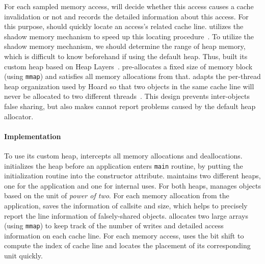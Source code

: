For each sampled memory access, \cheetah{} will decide whether this access causes a cache invalidation or not and records the detailed information about this access. For this purpose, \cheetah{} should quickly locate an access's related cache line. \Cheetah{} utilizes the shadow memory mechanism to speed up this locating procedure~\cite{qinzhao, Predator}. 
To utilize the shadow memory mechanism, we should determine the range of heap memory, which is difficult to know beforehand if using the default heap. Thus, \cheetah{} built its custom heap based on Heap Layers~\cite{Berger:2001:CHM:378795.378821}. \cheetah{} pre-allocates a fixed size of memory block (using \texttt{mmap}) and satisfies all memory allocations from that. \cheetah{} adapts the per-thread heap organization used by Hoard so that two objects in the same cache line will never be allocated to two different threads~\cite{Hoard}. This design prevents inter-objects false sharing, but also makes \cheetah{}  cannot report problems caused by the default heap allocator.  

\paragraph{Implementation} 
To use its custom heap, \cheetah{} intercepts all memory allocations and deallocations. \cheetah{} initializes the heap before an application enters \texttt{main} routine, by putting the initialization routine into the constructor attribute. \cheetah{} maintains two different heaps, one for the application and one for internal uses. For both heaps, \cheetah{} manages objects based on the unit of {\it power of two}. For each memory allocation from the application, \cheetah{} saves the information of callsite and size, which helps \cheetah{} to precisely report the line information of falsely-shared objects.  
\Cheetah{} allocates two large arrays (using \texttt{mmap}) to keep track of the number of writes and detailed access information on each cache line. For each memory access, \cheetah{} uses the bit shift to compute the index of cache line and locates the placement of its corresponding unit quickly. 


